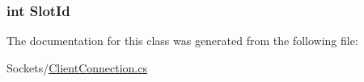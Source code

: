 \subsubsection[{Slot\+Id}]{\setlength{\rightskip}{0pt plus 5cm}int Slot\+Id}\label{classOTA_1_1Sockets_1_1ClientConnection_a635112a22f99c54b0fad66a41fae1c6e}


The documentation for this class was generated from the following file\+:\begin{DoxyCompactItemize}
\item 
Sockets/\hyperlink{ClientConnection_8cs}{Client\+Connection.\+cs}\end{DoxyCompactItemize}
